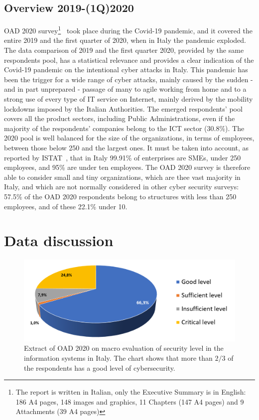 \documentclass{easychair}
\begin{document}
\subsection{Overview 2019-(1Q)2020}

OAD 2020 survey\footnote{The report is written in Italian, only the Executive Summary is in English: 186 A4 pages, 148 images and graphics, 11 Chapters
(147 A4 pages) and 9 Attachments (39 A4 pages)}~\cite{oad20} took place during the Covid-19 pandemic, and it covered the entire 2019 and the first quarter 
of 2020, when in Italy the pandemic exploded. The data comparison of 2019 and the first quarter 2020, provided by the same respondents pool, has a statistical relevance and provides a 
clear indication of the Covid-19 pandemic on the intentional cyber attacks in Italy. This pandemic has been the trigger for a wide range of cyber attacks, mainly 
caused by the sudden - and in part unprepared - passage of many to agile working from home and to a strong use of every type of IT service on Internet, mainly
derived by the mobility lockdowns imposed by the Italian Authorities. The emerged respondents’ pool covers all the product sectors, including Public Administrations,
even if the majority of the respondents’ companies belong to the ICT sector (30.8\%). The 2020 pool is well balanced for the size of the organizations, in terms
of employees, between those below 250 and the largest ones. It must be taken into account, as reported by ISTAT~\cite{istat21}, that in Italy 99.91\%
of enterprises are SMEs, under 250 employees, and 95\% are under ten employees. The OAD 2020 survey is therefore able to consider small and 
tiny organizations, which are thee vast majority in Italy, and which are not normally considered in other cyber security surveys: 57.5\% of the OAD 2020 respondents
belong to structures with less than 250 employees, and of these 22.1\% under 10. 

\section{Data discussion}\label{sec:DataDiscussion}

\begin{figure}
	\centering
		\includegraphics[width=1\textwidth]{pictures/fig1.png}
		\caption{Extract of OAD 2020 \cite{oad20} on macro evaluation of security level in the information systems in Italy. The chart shows that more than $ 2/3 $ of the respondents has a good level of cybersecurity.}
		\label{fig:1}
\end{figure}
\end{document}
